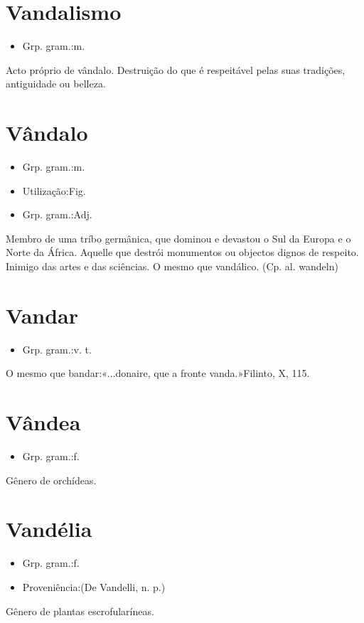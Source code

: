\documentclass{article}
\begin{document}
\section{Vandalismo}
\begin{itemize}
\item {Grp. gram.:m.}
\end{itemize}
Acto próprio de vândalo.
Destruição do que é respeitável pelas suas tradições, antiguidade ou belleza.
\section{Vândalo}
\begin{itemize}
\item {Grp. gram.:m.}
\end{itemize}
\begin{itemize}
\item {Utilização:Fig.}
\end{itemize}
\begin{itemize}
\item {Grp. gram.:Adj.}
\end{itemize}
Membro de uma tríbo germânica, que dominou e devastou o Sul da Europa e o Norte da África.
Aquelle que destrói monumentos ou objectos dignos de respeito.
Inimigo das artes e das sciências.
O mesmo que \textunderscore vandálico\textunderscore .
(Cp. al. \textunderscore wandeln\textunderscore )
\section{Vandar}
\begin{itemize}
\item {Grp. gram.:v. t.}
\end{itemize}
O mesmo que \textunderscore bandar\textunderscore :«\textunderscore ...donaire, que a fronte vanda.\textunderscore »Filinto, X, 115.
\section{Vândea}
\begin{itemize}
\item {Grp. gram.:f.}
\end{itemize}
Gênero de orchídeas.
\section{Vandélia}
\begin{itemize}
\item {Grp. gram.:f.}
\end{itemize}
\begin{itemize}
\item {Proveniência:(De \textunderscore Vandelli\textunderscore , n. p.)}
\end{itemize}
Gênero de plantas escrofularíneas.
\end{document}
